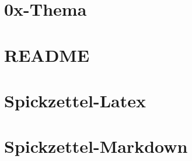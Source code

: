 



%
%
%
\chapter{0x-Thema}

\chapter{README}

\chapter{Spickzettel-Latex}

\chapter{Spickzettel-Markdown}




%
%

